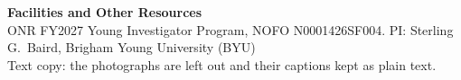 
\setlength{\emergencystretch}{3em}

\begin{center}\textbf{Facilities and Other Resources}\\
ONR FY2027 Young Investigator Program, NOFO N0001426SF004. PI: Sterling G.\ Baird, Brigham Young University (BYU)\\
{\small\color{gray}Text copy: the photographs are left out and their captions kept as plain text.}\end{center}

